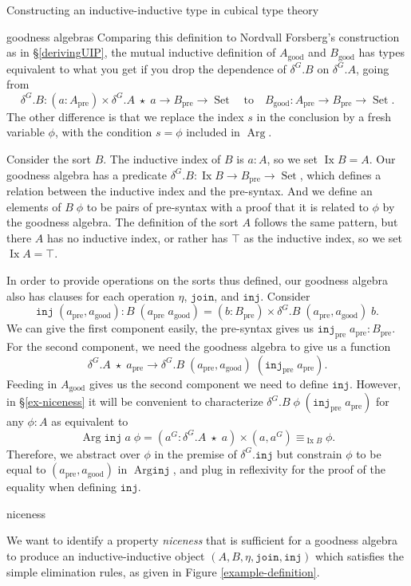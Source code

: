 \documentclass[acmsmall,review]{acmart}\settopmatter{printfolios=true,printccs=false,printacmref=false}
\DeclareMathOperator{\USet}{Set}
\DeclareMathOperator{\Arg}{Arg}
\DeclareMathOperator{\Ix}{Ix}
\newcommand{\pre}[1]{{#1}_\text{pre}}
\newcommand{\good}[1]{{#1}_\text{good}}
\newcommand{\IdA}[3]{{#1}\equiv_{#3}{#2}}
\newcommand{\join}{\texttt{join}}
\newcommand{\inj}{\texttt{inj}}
\def\Forsberg/{Nordvall Forsberg}
\begin{document}
\begin{section}{Constructing an inductive-inductive type in cubical type theory}
\begin{subsection}{goodness algebras}
Comparing this definition to \Forsberg/'s construction as in \S\ref{derivingUIP}, the mutual inductive definition of $\good{A}$ and $\good{B}$ has types equivalent to what you get if you drop the dependence of $\delta^G.B$ on $\delta^G.A$, going from \[\delta^G.B : (a : \pre{A}) \times \delta^G.A\;\star\;a \to \pre{B} \to \USet \quad\text{to}\quad \good{B} : \pre{A} \to \pre{B} \to \USet.\] The other difference is that we replace the index $s$ in the conclusion by a fresh variable $\phi$, with the condition $s = \phi$ included in $\Arg$.

Consider the sort $B$. The inductive index of $B$ is $a : A$, so we set $\Ix B = A$. Our goodness algebra has a predicate $\delta^G.B : \Ix B \to \pre{B} \to \USet$, which defines a relation between the inductive index and the pre-syntax. And we define an elements of $B\;\phi$ to be pairs of pre-syntax with a proof that it is related to $\phi$ by the goodness algebra. The definition of the sort $A$ follows the same pattern, but there $A$ has no inductive index, or rather has $\top$ as the inductive index, so we set $\Ix A = \top$.

In order to provide operations on the sorts thus defined, our goodness algebra also has clauses for each operation $\eta$, $\join$, and $\inj$. Consider \[\inj\;(\pre{a}, \good{a}) : B\;(\pre{a}\;\good{a}) = (b : \pre{B}) \times \delta^G.B\;(\pre{a}, \good{a})\;b.\] We can give the first component easily, the pre-syntax gives us $\pre{\inj}\;\pre{a} : \pre{B}$. For the second component, we need the goodness algebra to give us a function \[\delta^G.A\;\star\;\pre{a} \to \delta^G.B\;(\pre{a}, \good{a})\;(\pre{\inj}\;\pre{a}).\] Feeding in $\good{A}$ gives us the second component we need to define $\inj$. However, in \S\ref{ex-niceness} it will be convenient to characterize $\delta^G.B\;\phi\;(\pre{\inj}\;\pre{a})$ for any $\phi : A$ as equivalent to \[\Arg \inj\;a\;\phi = (a^G : \delta^G.A\;\star\;a) \times \IdA{(a , a^G)}{\phi}{\Ix B}.\] Therefore, we abstract over $\phi$ in the premise of $\delta^G.\inj$ but constrain $\phi$ to be equal to $(\pre{a}, \good{a})$ in $\Arg\inj$, and plug in reflexivity for the proof of the equality when defining $\inj$.

\end{subsection}

\begin{subsection}{niceness}\label{ex-niceness}

We want to identify a property \emph{niceness} that is sufficient for a goodness algebra to produce an inductive-inductive object $(A, B, \eta, \join, \inj)$ which satisfies the simple elimination rules, as given in Figure \ref{example-definition}.


\end{subsection}
\end{section}
\end{document}
